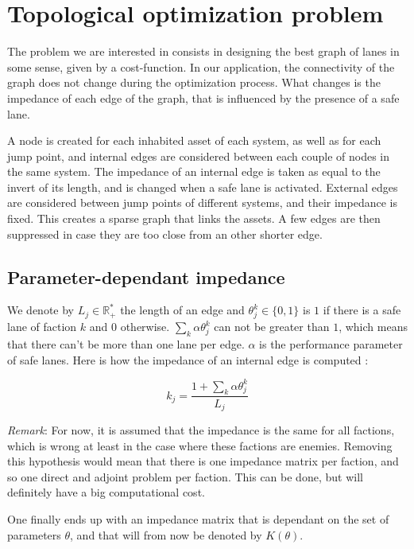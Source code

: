 \documentclass[11pt,a4paper]{article}		%
\begin{document}
\section{Topological optimization problem}

The problem we are interested in consists in designing the best graph of lanes in some sense, given by a cost-function. In our application, the connectivity of the graph does not change during the optimization process. What changes is the impedance of each edge of the graph, that is influenced by the presence of a safe lane.

A node is created for each inhabited asset of each system, as well as for each jump point, and internal edges are considered between each couple of nodes in the same system. The impedance of an internal edge is taken as equal to the invert of its length, and is changed when a safe lane is activated. External edges are considered between jump points of different systems, and their impedance is fixed. This creates a sparse graph that links the assets. A few edges are then suppressed in case they are too close from an other shorter edge.

\subsection{Parameter-dependant impedance}

We denote by $L_j\in\mathbb{R}^*_+$ the length of an edge and $\theta_j^k\in\{0,1\}$ is $1$ if there is a safe lane of faction $k$ and $0$ otherwise. $\sum_k\alpha\theta_j^k$ can not be greater than $1$, which means that there can't be more than one lane per edge. $\alpha$ is the performance parameter of safe lanes. Here is how the impedance of an internal edge is computed :

\begin{equation}\label{eqn:stiff}
k_j = \dfrac{1+\sum_k\alpha\theta_j^k}{L_j}
\end{equation}

\textit{Remark}: For now, it is assumed that the impedance is the same for all factions, which is wrong at least in the case where these factions are enemies. Removing this hypothesis would mean that there is one impedance matrix per faction, and so one direct and adjoint problem per faction. This can be done, but will definitely have a big computational cost.

One finally ends up with an impedance matrix that is dependant on the set of parameters $\theta$, and that will from now be denoted by $K(\theta)$.
\end{document}
